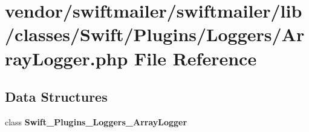 \section{vendor/swiftmailer/swiftmailer/lib/classes/\+Swift/\+Plugins/\+Loggers/\+Array\+Logger.php File Reference}
\label{_array_logger_8php}
\subsection*{Data Structures}
\begin{DoxyCompactItemize}
\item 
class {\bf Swift\+\_\+\+Plugins\+\_\+\+Loggers\+\_\+\+Array\+Logger}
\end{DoxyCompactItemize}
